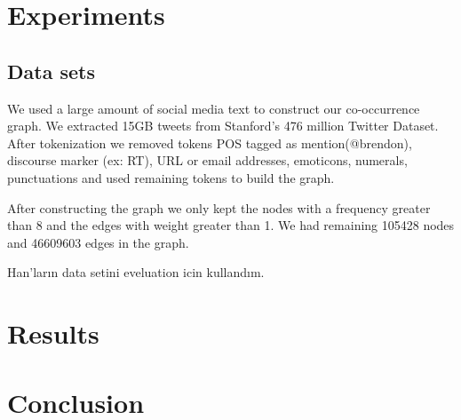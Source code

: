 \section{Experiments}
\label{sec:experiments}

\subsection{Data sets}

We used a large amount of social media text to construct our co-occurrence graph. We extracted 15GB tweets from Stanford's 476 million Twitter Dataset\cite{DBLP:conf/wsdm/YangL11}. After tokenization we removed tokens POS tagged as mention(@brendon), discourse marker (ex: RT), URL or email addresses, emoticons, numerals, punctuations and used remaining tokens to build the graph.

After constructing the graph we only kept the nodes with a frequency greater than 8 and the edges with weight greater than 1. We had remaining 105428 nodes and 46609603 edges in the graph.

Han'ların data setini eveluation icin kullandım.

\section{Results}


\section{Conclusion}

